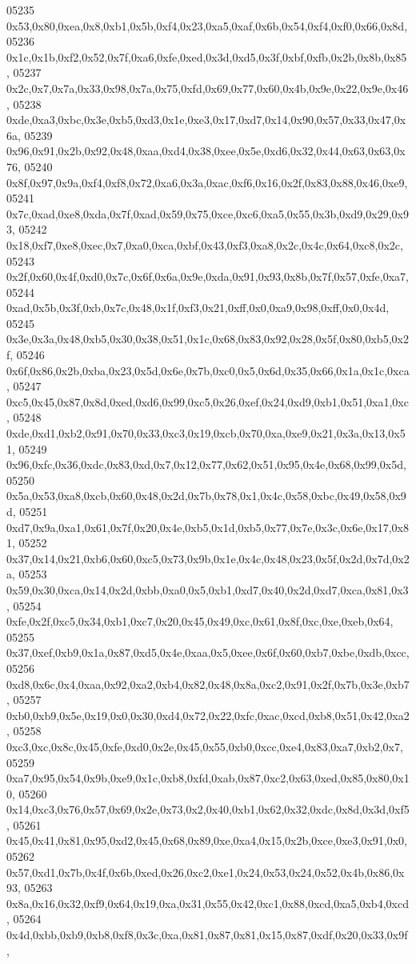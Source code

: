 \begin{DoxyCode}
05235   0x53,0x80,0xea,0x8,0xb1,0x5b,0xf4,0x23,0xa5,0xaf,0x6b,0x54,0xf4,0xf0,0x66,0x8d,
05236   0x1c,0x1b,0xf2,0x52,0x7f,0xa6,0xfe,0xed,0x3d,0xd5,0x3f,0xbf,0xfb,0x2b,0x8b,0x85,
05237   0x2c,0x7,0x7a,0x33,0x98,0x7a,0x75,0xfd,0x69,0x77,0x60,0x4b,0x9e,0x22,0x9e,0x46,
05238   0xde,0xa3,0xbc,0x3e,0xb5,0xd3,0x1e,0xe3,0x17,0xd7,0x14,0x90,0x57,0x33,0x47,0x6a,
05239   0x96,0x91,0x2b,0x92,0x48,0xaa,0xd4,0x38,0xee,0x5e,0xd6,0x32,0x44,0x63,0x63,0x76,
05240   0x8f,0x97,0x9a,0xf4,0xf8,0x72,0xa6,0x3a,0xac,0xf6,0x16,0x2f,0x83,0x88,0x46,0xe9,
05241   0x7c,0xad,0xe8,0xda,0x7f,0xad,0x59,0x75,0xce,0xc6,0xa5,0x55,0x3b,0xd9,0x29,0x93,
05242   0x18,0xf7,0xe8,0xec,0x7,0xa0,0xca,0xbf,0x43,0xf3,0xa8,0x2c,0x4c,0x64,0xc8,0x2c,
05243   0x2f,0x60,0x4f,0xd0,0x7c,0x6f,0x6a,0x9e,0xda,0x91,0x93,0x8b,0x7f,0x57,0xfe,0xa7,
05244   0xad,0x5b,0x3f,0xb,0x7c,0x48,0x1f,0xf3,0x21,0xff,0x0,0xa9,0x98,0xff,0x0,0x4d,
05245   0x3e,0x3a,0x48,0xb5,0x30,0x38,0x51,0x1c,0x68,0x83,0x92,0x28,0x5f,0x80,0xb5,0x2f,
05246   0x6f,0x86,0x2b,0xba,0x23,0x5d,0x6e,0x7b,0xc0,0x5,0x6d,0x35,0x66,0x1a,0x1c,0xca,
05247   0xc5,0x45,0x87,0x8d,0xed,0xd6,0x99,0xc5,0x26,0xef,0x24,0xd9,0xb1,0x51,0xa1,0xc,
05248   0xde,0xd1,0xb2,0x91,0x70,0x33,0xc3,0x19,0xcb,0x70,0xa,0xe9,0x21,0x3a,0x13,0x51,
05249   0x96,0xfc,0x36,0xdc,0x83,0xd,0x7,0x12,0x77,0x62,0x51,0x95,0x4e,0x68,0x99,0x5d,
05250   0x5a,0x53,0xa8,0xcb,0x60,0x48,0x2d,0x7b,0x78,0x1,0x4c,0x58,0xbc,0x49,0x58,0x9d,
05251   0xd7,0x9a,0xa1,0x61,0x7f,0x20,0x4e,0xb5,0x1d,0xb5,0x77,0x7e,0x3c,0x6e,0x17,0x81,
05252   0x37,0x14,0x21,0xb6,0x60,0xc5,0x73,0x9b,0x1e,0x4c,0x48,0x23,0x5f,0x2d,0x7d,0x2a,
05253   0x59,0x30,0xca,0x14,0x2d,0xbb,0xa0,0x5,0xb1,0xd7,0x40,0x2d,0xd7,0xca,0x81,0x3,
05254   0xfe,0x2f,0xc5,0x34,0xb1,0xc7,0x20,0x45,0x49,0xc,0x61,0x8f,0xc,0xe,0xeb,0x64,
05255   0x37,0xef,0xb9,0x1a,0x87,0xd5,0x4e,0xaa,0x5,0xee,0x6f,0x60,0xb7,0xbe,0xdb,0xcc,
05256   0xd8,0x6c,0x4,0xaa,0x92,0xa2,0xb4,0x82,0x48,0x8a,0xc2,0x91,0x2f,0x7b,0x3e,0xb7,
05257   0xb0,0xb9,0x5e,0x19,0x0,0x30,0xd4,0x72,0x22,0xfc,0xac,0xcd,0xb8,0x51,0x42,0xa2,
05258   0xc3,0xc,0x8c,0x45,0xfe,0xd0,0x2e,0x45,0x55,0xb0,0xcc,0xe4,0x83,0xa7,0xb2,0x7,
05259   0xa7,0x95,0x54,0x9b,0xe9,0x1c,0xb8,0xfd,0xab,0x87,0xc2,0x63,0xed,0x85,0x80,0x10,
05260   0x14,0xc3,0x76,0x57,0x69,0x2e,0x73,0x2,0x40,0xb1,0x62,0x32,0xdc,0x8d,0x3d,0xf5,
05261   0x45,0x41,0x81,0x95,0xd2,0x45,0x68,0x89,0xe,0xa4,0x15,0x2b,0xce,0xe3,0x91,0x0,
05262   0x57,0xd1,0x7b,0x4f,0x6b,0xed,0x26,0xc2,0xe1,0x24,0x53,0x24,0x52,0x4b,0x86,0x93,
05263   0x8a,0x16,0x32,0xf9,0x64,0x19,0xa,0x31,0x55,0x42,0xc1,0x88,0xcd,0xa5,0xb4,0xcd,
05264   0x4d,0xbb,0xb9,0xb8,0xf8,0x3c,0xa,0x81,0x87,0x81,0x15,0x87,0xdf,0x20,0x33,0x9f,

\end{DoxyCode}
